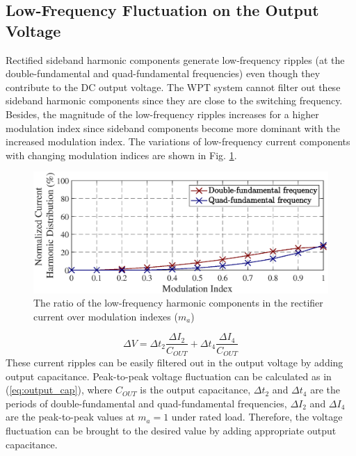 \documentclass[journal]{IEEEtran}
\begin{document}
\vspace*{-6mm}
\subsection{Low-Frequency Fluctuation on the Output Voltage}
Rectified sideband harmonic components generate low-frequency ripples (at the double-fundamental and quad-fundamental frequencies) even though they contribute to the DC output voltage. 
The WPT system cannot filter out these sideband harmonic components since they are close to the switching frequency. 
Besides, the magnitude of the low-frequency ripples increases for a higher modulation index since sideband components become more dominant with the increased modulation index.
The variations of low-frequency current components with changing modulation indices are shown in Fig. \ref{fig:low_freq}. 
\vspace*{-2mm}
\begin{figure}[h!]
    \centering
    \includegraphics[width=1\linewidth]{low_frequeny_ripple.eps}
    \caption{The ratio of the low-frequency harmonic components in the rectifier current over modulation indexes ($m_a$)}
    \label{fig:low_freq}
\end{figure}
\vspace*{-2mm}
\begin{equation}
\Delta V =\Delta t_2 \frac{\Delta I_2}{C_{OUT}}+\Delta t_4 \frac{\Delta I_4}{C_{OUT}}
\label{eq:output_cap}
\end{equation}
These current ripples can be easily filtered out in the output voltage by adding output capacitance. 
Peak-to-peak voltage fluctuation can be calculated as in (\ref{eq:output_cap}), where $C_{OUT}$ is the output capacitance, $\Delta t_2$ and $\Delta t_4$  are the periods of double-fundamental and quad-fundamental frequencies, $\Delta I_2$ and $\Delta I_4$ are the peak-to-peak values at $m_a=1$ under rated load. 
Therefore, the voltage fluctuation can be brought to the desired value by adding appropriate output capacitance.
\end{document}
